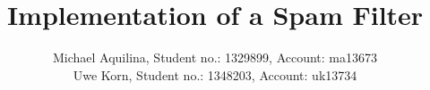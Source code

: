 \documentclass[12pt,journal]{IEEEtran}
\begin{document}
\newcommand{\todo}[1]{{\color{red} #1}}

\title{Implementation of a Spam Filter}
\author{Michael Aquilina, Student no.: 1329899, Account: ma13673 \\
    Uwe Korn, Student no.: 1348203, Account: uk13734}
\maketitle
\IEEEpeerreviewmaketitle













\end{document}
